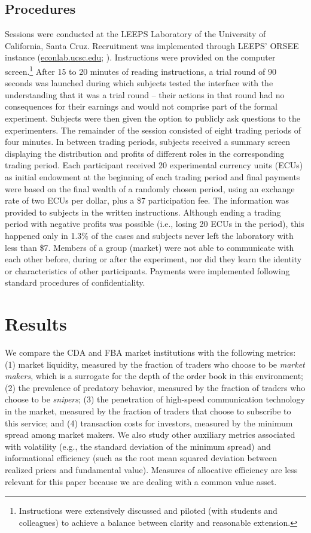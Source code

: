 \documentclass[12pt]{article}
\begin{document}
\subsection{Procedures}

Sessions were conducted at the LEEPS Laboratory of the University of California, Santa Cruz. Recruitment was implemented through LEEPS' ORSEE instance (\url{econlab.ucsc.edu}; \cite{Greiner2015}). Instructions were provided on the computer screen.\footnote{Instructions were extensively discussed and piloted (with students and colleagues) to achieve a balance between clarity and reasonable extension.} After 15 to 20 minutes of reading instructions, a trial round of 90 seconds was launched during which subjects tested the interface with the understanding that it was a trial round -- their actions in that round had no consequences for their earnings and would not comprise part of the formal experiment. Subjects were then given the option to publicly ask questions to the experimenters. The remainder of the session consisted of eight trading periods of four minutes. 
In between trading periods, subjects received a summary screen displaying the distribution and profits of different roles in the corresponding trading period. Each participant received 20 experimental currency units (ECUs) as initial endowment at the beginning of each trading period and final payments were based on the final wealth of a randomly chosen period, using an exchange rate of two ECUs per dollar, plus a \$7 participation fee. The information was provided to subjects in the written instructions. 
%
Although ending a trading period with negative profits was possible (i.e., losing 20 ECUs in the period), this happened only in 1.3\% of the cases and subjects never left the laboratory with less than \$7.
Members of a group (market) were not able to communicate with each other before, during or after the experiment, nor did they learn the identity or characteristics of other participants. Payments were implemented following standard procedures of confidentiality.


\section{Results \label{Results}}

We compare the CDA and FBA market institutions with the following metrics: (1) market liquidity, measured by the fraction of traders who choose to be \textit{market makers}, which is a surrogate for the depth of the order book in this environment; (2) the prevalence of predatory behavior, measured by the fraction of traders who choose to be \textit{snipers}; (3) the penetration of high-speed communication technology in the market, measured by the fraction of traders that choose to subscribe to this service; and (4) transaction costs for investors, measured by the minimum spread among market makers. We also study other auxiliary metrics associated with volatility (e.g.,  the standard deviation of the minimum spread) and informational efficiency (such as the root mean squared deviation between realized prices and fundamental value). Measures of allocative efficiency are less relevant for this paper because we are dealing with a common value asset. 
\end{document}
